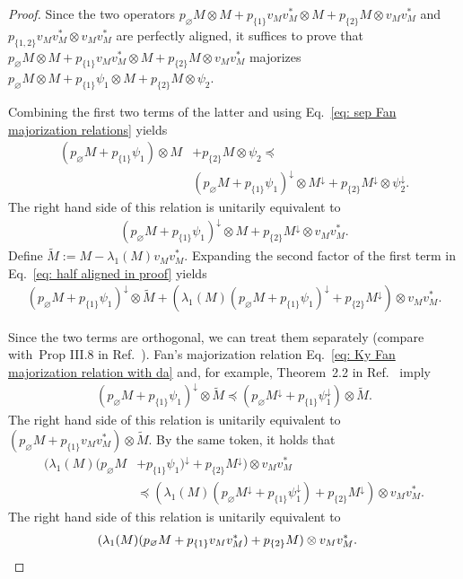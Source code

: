 \documentclass[12pt]{article}
\theoremstyle{definition}
\numberwithin{equation}{section}
\numberwithin{equation}{section}
\newcommand{\la}{\lambda}
\newcommand{\da}{\downarrow}
\newcommand{\varnot}{\varnothing}
\begin{document}
\begin{proof}
Since the two operators \(p_{\varnot}  M \otimes M + p_{\{1\}} v_M v_M^* \otimes M + p_{\{2\}} M \otimes v_M v_M^*\) and \(p_{\{1,2\}} v_M v_M^* \otimes v_M v_M^*\) are perfectly aligned, it suffices to prove that \(p_{\varnot}  M \otimes M + p_{\{1\}} v_M v_M^* \otimes M + p_{\{2\}} M \otimes v_M v_M^*\) majorizes \(p_{\varnot}  M \otimes M + p_{\{1\}} \psi_1 \otimes M + p_{\{2\}} M \otimes \psi_2\). 

Combining the first two terms of the latter and using Eq.~\ref{eq: sep Fan majorization relations} yields
\begin{equation}
\label{eq:app of sep fan}
\begin{aligned}
( p_{\varnot}  M +p_{\{1\}} \psi_1)\otimes M &+ p_{\{2\}} M \otimes \psi_2 \preceq \\
&( p_{\varnot}  M +p_{\{1\}} \psi_1)^{\da} \otimes M^{\da} + p_{\{2\}} M^\da \otimes \psi_2^{\da}.
\end{aligned}
\end{equation}
The right hand side of this relation is unitarily equivalent to 
\begin{align}
\label{eq: half aligned in proof}
(p_{\varnot}  M +p_{\{1\}} \psi_1)^{\da} \otimes M +  p_{\{2\}} M^\da \otimes v_M v_M^*.
\end{align}
Define \(\tilde{M} := M - \la_1 (M) v_M v_M^*\). Expanding the second factor of the first term in Eq.~\ref{eq: half aligned in proof} yields
\begin{align}
(p_{\varnot}  M +p_{\{1\}} \psi_1)^{\da} \otimes \tilde{M} + (\la_1(M) (p_{\varnot}  M +p_{\{1\}} \psi_1)^{\da} +  p_{\{2\}} M^\da) \otimes v_M v_M^*.
\end{align}

Since the two terms are orthogonal, we can treat them separately (compare with~Prop III.8 in Ref.~\cite{Alhejji2024}). Fan's majorization relation Eq.~\ref{eq: Ky Fan majorization relation with da} and, for example, Theorem~2.2 in Ref.~\cite{Bondar2003} imply
\begin{align}
(p_{\varnot}  M +p_{\{1\}} \psi_1)^{\da} \otimes \tilde{M} \preceq (p_{\varnot}  M^\da +p_{\{1\}} \psi_1^\da) \otimes \tilde{M}.
\end{align}
The right hand side of this relation is unitarily equivalent to \( (p_{\varnot}  M +p_{\{1\}} v_M v_M^*) \otimes \tilde{M}\). By the same token, it holds that
\begin{equation}
\begin{aligned}
(\la_1(M) (p_{\varnot}  M &+p_{\{1\}} \psi_1)^{\da}  +  p_{\{2\}} M^\da) \otimes v_M v_M^* \\
&\preceq (\la_1(M) (p_{\varnot}  M^\da +p_{\{1\}} \psi_1^\da) +  p_{\{2\}} M^\da) \otimes v_M v_M^*.
\end{aligned}
\end{equation}
The right hand side of this relation is unitarily equivalent to 
\begin{align}
(\la_1(M) (p_{\varnot}  M +p_{\{1\}} v_M v_M^*) +  p_{\{2\}} M) \otimes v_M v_M^*. &\qedhere
\end{align}
\end{proof}
\end{document}
